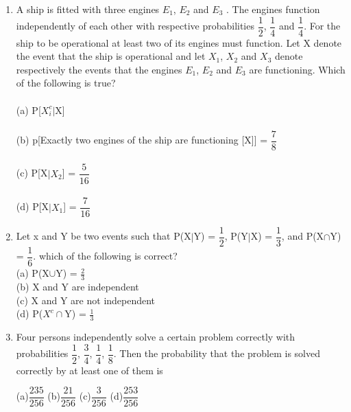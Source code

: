 \documentclass[journal,12pt,twocolumn]{IEEEtran}
\begin{document}
\begin{enumerate}[label=\arabic*]
    \\
    (a) P(E) = $\dfrac{4}{5}$,P(F) = $\dfrac{3}{5}$ \\
    \\
    (b) P(E) = $\dfrac{1}{5}$,P(F) = $\dfrac{2}{5}$ \\
    \\
    (c) P(E) = $\dfrac{2}{5}$,P(F) = $\dfrac{1}{5}$ \\
    \\
    (d) P(E) = $\dfrac{3}{5}$,P(F) = $\dfrac{4}{5}$ \\
    \item A ship is fitted with three engines $E_1$, $E_2$ and $E_3$ . The engines function independently of each other with respective probabilities $\dfrac{1}{2}$, $\dfrac{1}{4}$ and $\dfrac{1}{4}$. For the ship to be operational at least two of its engines must function. Let X denote the event that the ship is operational and let $X_1$, $X_2$ and $X_3$ denote respectively the events that the engines $E_1$, $E_2$ and $E_3$ are functioning. Which of the following is true?\\
    \\
    (a) P[$X^{c}_i|$X]  \\
    \\
    (b) p[Exactly two engines of the ship are functioning [X]] = $\dfrac{7}{8}$\\
    \\
    (c) P[X$|X_2$] = $\dfrac{5}{16}$\\
    \\
    (d) P[X$|X_1$] = $\dfrac{7}{16}$\\
    \item Let x and Y be two events such that P(X$|$Y) = $\dfrac{1}{2}$, P(Y$|$X) = $\dfrac{1}{3}$, and P(X$\cap$Y) = $\dfrac{1}{6}$. which of the following is correct?\\
    (a) P(X$\cup$Y) = $\frac{2}{3}$\\
    (b) X and Y are independent\\
    (c) X and Y are not independent\\
    (d) P($X^{c}\cap$Y) = $\frac{1}{3}$\\
    \item Four persons independently solve a certain problem correctly with probabilities $\dfrac{1}{2}$, $\dfrac{3}{4}$, $\dfrac{1}{4}$, $\dfrac{1}{8}$. Then the probability that the problem is solved correctly by at least one of them is
    \begin{multicols}{4}
    (a)$\dfrac{235}{256}$ (b)$\dfrac{21}{256}$  (c)$\dfrac{3}{256}$     	(d)$\dfrac{253}{256}$

\end{multicols}
\end{enumerate}
\end{document}
